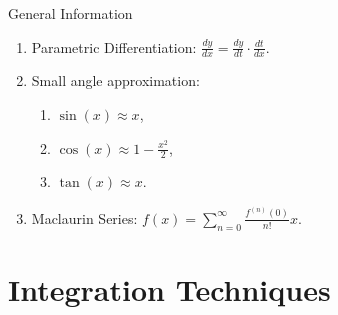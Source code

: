 \documentclass[oneside]{book}
\begin{document}
\begin{stbox}{General Information}
\begin{enumerate}
    \item Parametric Differentiation: \(\frac{dy}{dx}=\frac{dy}{dt}\cdot \frac{dt}{dx}\).
    \item Small angle approximation: 
    \begin{enumerate}
      \item \(\sin(x) \approx x\),
      \item \(\cos(x) \approx 1-\frac{x^2}{2}\),
      \item \(\tan(x) \approx x\).
    \end{enumerate}
    \item Maclaurin Series: \(f(x)=\sum_{n=0}^{\infty}\frac{f^{(n)}(0)}{n!}x\).
  \end{enumerate}
\end{stbox}
\chapter{Integration Techniques}
\end{document}
